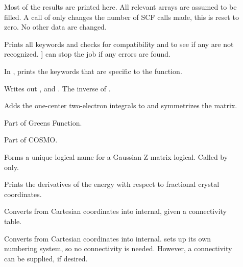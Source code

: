 \begin{description}
\item[] Most of the results are printed here. All  relevant
arrays are assumed to be filled. A call of  only  changes the
number of SCF calls made, this is reset to zero.  No other data are changed. 

\item[] Prints all keywords and checks for compatibility and to
see if any are not recognized.   ] can stop the job if any errors
are found.

\item[] In ,  prints the keywords that
are specific to the  function.

\item[] Writes out ,  and 
.  The inverse of .

\item[] Adds the one-center two-electron integrals to  and
symmetrizes the matrix.

\item[] Part of Greens Function.

\item[] Part of COSMO.

\item[] Forms a unique logical name for a Gaussian Z-matrix logical. 
Called  by  only.

\item[] Prints the derivatives of the energy with respect to
fractional crystal coordinates.

\item[] Converts from Cartesian coordinates into internal, given a
connectivity table.

\item[] Converts from Cartesian coordinates into internal.
 sets up its own numbering system, so no connectivity is needed. 
However, a connectivity can be supplied, if desired.
\end{description}
